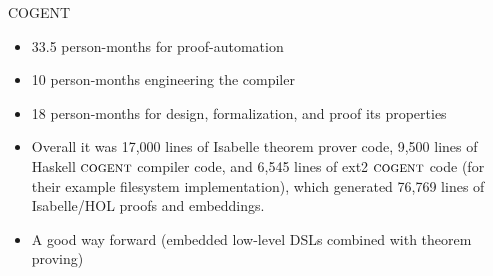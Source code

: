 \documentclass[aspectratio=169]{beamer}
\begin{document}
%


\begin{frame}{COGENT}
    \begin{itemize}
        \item 33.5 person-months for proof-automation
        \item 10 person-months engineering the compiler
        \item 18 person-months for design, formalization, and proof its properties
        \item Overall it was 17,000 lines of Isabelle theorem prover code, 9,500 lines of Haskell $\textsc{cogent}$ compiler code, and 6,545 lines of ext2 $\textsc{cogent}$ code (for their example filesystem implementation), which generated 76,769 lines of Isabelle/HOL proofs and embeddings.
        \item A good way forward (embedded low-level DSLs combined with theorem proving)
    \end{itemize}
\end{frame}
\end{document}

